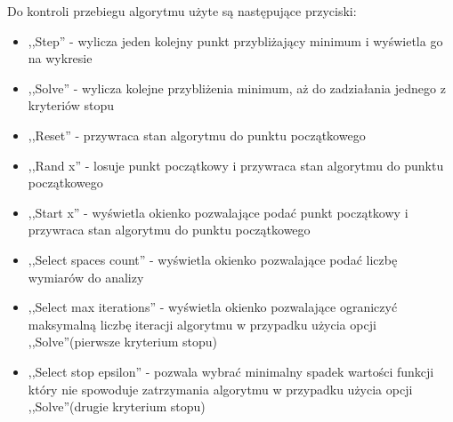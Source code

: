\documentclass[12pt]{article}
\begin{document}
Do kontroli przebiegu algorytmu użyte są następujące przyciski:

\begin{itemize}
  \item ,,Step'' - wylicza jeden kolejny punkt przybliżający minimum i wyświetla
  go na wykresie
  \item ,,Solve'' - wylicza kolejne przybliżenia minimum, aż do zadziałania
  jednego z kryteriów stopu
  \item ,,Reset'' - przywraca stan algorytmu do punktu początkowego
  \item ,,Rand x'' - losuje punkt początkowy i przywraca stan algorytmu do
  punktu początkowego
  \item ,,Start x'' - wyświetla okienko pozwalające podać punkt początkowy i
  przywraca stan algorytmu do punktu początkowego
  \item ,,Select spaces count'' - wyświetla okienko pozwalające podać liczbę
  wymiarów do analizy
  \item ,,Select max iterations'' - wyświetla okienko pozwalające ograniczyć
  maksymalną liczbę iteracji algorytmu w przypadku użycia opcji
  ,,Solve''(pierwsze kryterium stopu)
  \item ,,Select stop epsilon'' - pozwala wybrać minimalny spadek wartości
  funkcji który nie spowoduje zatrzymania algorytmu w przypadku użycia opcji
  ,,Solve''(drugie kryterium stopu)
\end{itemize}
\end{document}
